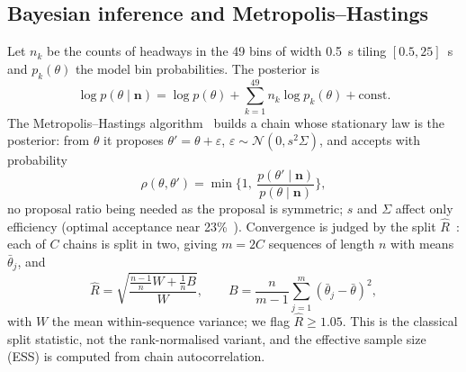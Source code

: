\documentclass[10pt,a4paper]{article}
\numberwithin{equation}{section}
\begin{document}
\subsection{Bayesian inference and Metropolis--Hastings}
Let $n_k$ be the counts of headways in the 49 bins of width 0.5~s tiling $[0.5,25]$~s and $p_k(\theta)$ the model bin probabilities. The posterior is
\begin{equation}\label{eq:posterior}
\log p(\theta\mid\mathbf n)=\log p(\theta)+\sum_{k=1}^{49}n_k\log p_k(\theta)+\text{const.}
\end{equation}
The Metropolis--Hastings algorithm~\cite{hastings1970} builds a chain whose stationary law is the posterior: from $\theta$ it proposes $\theta'=\theta+\varepsilon$, $\varepsilon\sim\mathcal N(0,s^2\Sigma)$, and accepts with probability
\begin{equation}\label{eq:accept}
\rho(\theta,\theta')=\min\Big\{1,\ \frac{p(\theta'\mid\mathbf n)}{p(\theta\mid\mathbf n)}\Big\},
\end{equation}
no proposal ratio being needed as the proposal is symmetric; $s$ and $\Sigma$ affect only efficiency (optimal acceptance near 23\%~\cite{roberts1997}).
Convergence is judged by the split $\hat R$~\cite{vehtari2021}: each of $C$ chains is split in two, giving $m=2C$ sequences of length $n$ with means $\bar\theta_j$, and
\begin{equation}\label{eq:rhat}
\hat R=\sqrt{\frac{\tfrac{n-1}{n}W+\tfrac1nB}{W}},\qquad B=\frac{n}{m-1}\sum_{j=1}^m(\bar\theta_j-\bar\theta)^2,
\end{equation}
with $W$ the mean within-sequence variance; we flag $\hat R\ge1.05$. This is the classical split statistic, not the rank-normalised variant, and the effective sample size (ESS) is computed from chain autocorrelation.
\end{document}
